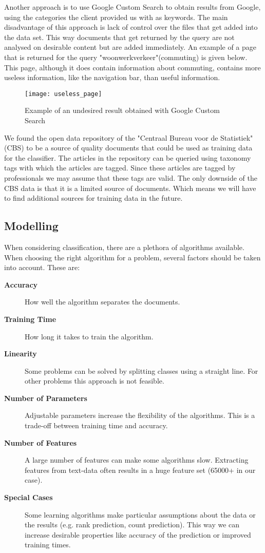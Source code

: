 Another approach is to use Google Custom Search to obtain results from Google, using the categories the client provided us with as keywords. The main disadvantage of this approach is lack of control over the files that get added into the data set. This way documents that get returned by the query are not analysed on desirable content but are added immediately. An example of a page that is returned for the query "woonwerkverkeer"(commuting) is given below. This page, although it does contain information about commuting, contains more useless information, like the navigation bar, than useful information.

\begin{figure}[H]
\centering
\texttt{[image: useless\_page]}
\caption{Example of an undesired result obtained with Google Custom Search}
\label{fig:useless_page}
\end{figure}

We found the open data repository of the "Centraal Bureau voor de Statistiek" (CBS) to be a source of quality documents that could be used as training data for the classifier. The articles in the repository can be queried using taxonomy tags with which the articles are tagged. Since these articles are tagged by professionals we may assume that these tags are valid. The only downside of the CBS data is that it is a limited source of documents. Which means we will have to find additional sources for training data in the future.

\subsection{Modelling}
When considering classification, there are a plethora of algorithms available. When choosing the right algorithm for a problem, several factors should be taken into account\cite{MLCheatSheet}. These are:
    \begin{description}
        \item[\textbf{Accuracy}] How well the algorithm separates the documents.
        \item[\textbf{Training Time}] How long it takes to train the algorithm.
        \item[\textbf{Linearity}] Some problems can be solved by splitting classes using a straight line. For other problems this approach is not feasible.
        \item[\textbf{Number of Parameters}] Adjustable parameters increase the flexibility of the algorithms. This is a trade-off between training time and accuracy.
        \item[\textbf{Number of Features}] A large number of features can make some algorithms slow. Extracting features from text-data often results in a huge feature set (65000+ in our case).
        \item[\textbf{Special Cases}] Some learning algorithms make particular assumptions about the data or the results (e.g. rank prediction, count prediction). This way we can increase desirable properties like accuracy of the prediction or improved training times. 
    \end{description}

